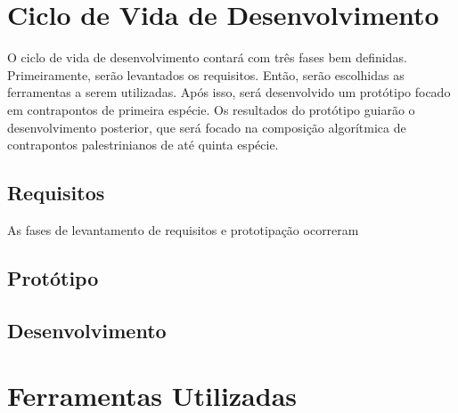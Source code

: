   \section[Ciclo de Vida de Desenvolvimento]{Ciclo de Vida de Desenvolvimento}

    O ciclo de vida de desenvolvimento contará com três fases bem definidas. Primeiramente, serão levantados os requisitos. Então, serão escolhidas as ferramentas a serem utilizadas. Após isso, será desenvolvido um protótipo focado em contrapontos de primeira espécie. Os resultados do protótipo guiarão o desenvolvimento posterior, que será focado na composição algorítmica de contrapontos palestrinianos de até quinta espécie.



  \subsection[Requisitos]{Requisitos}

    As fases de levantamento de requisitos e prototipação ocorreram
  \subsection[Protótipo]{Protótipo}
  \subsection[Desenvolvimento]{Desenvolvimento}


  \section[Ferramentas Utilizadas]{Ferramentas Utilizadas}
